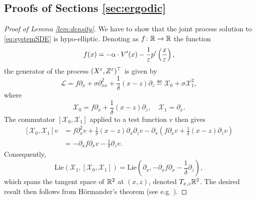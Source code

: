 \documentclass[10pt]{article}
\begin{document}
\begin{appendices}
	
\section{Proofs of Sections \ref{sec:ergodic}}\label{ap:ProofsErgodic}

\begin{proof}[Proof of Lemma \ref{lem:density}] We have to show that the joint process solution to \eqref{eq:systemSDE} is hypo-elliptic. Denoting as $f\colon \mathbb{R} \to \mathbb{R}$ the function 
	\begin{equation}
	f(x) = -\alpha \cdot V'(x) - \frac1{\varepsilon} p'\left(\frac{x}{\varepsilon}\right),
	\end{equation}
	the generator of the process $(X^\varepsilon, Z^\varepsilon)^\top$ is given by
	\begin{equation}
	\mathcal L = f \partial_x + \sigma \partial_{xx}^2 + \frac1\delta (x - z)\partial_z \eqdef \mathcal X_0 + \sigma \mathcal X_1^2, 
	\end{equation}
	where 
	\begin{equation}
	\mathcal X_0 = f \partial_x + \frac1\delta (x - z)\partial_z, \quad \mathcal X_1 = \partial_x.
	\end{equation}
	The commutator $[\mathcal X_0, \mathcal X_1]$ applied to a test function $v$ then gives
	\begin{equation}
	\begin{aligned}
	[\mathcal X_0, \mathcal X_1]v &= f \partial_x^2 v + \frac1\delta (x - z) \partial_x \partial_z v  - \partial_x\left(f\partial_x v + \frac1\delta (x - z)\partial_z v\right)\\
	&= -\partial_x f \partial_x v - \frac1\delta \partial_z v.
	\end{aligned}
	\end{equation}
	Consequently, 
	\begin{equation}
	\mathrm{Lie}\left(\mathcal X_1, [\mathcal X_0, \mathcal X_1]\right) = \mathrm{Lie} \left(\partial_x, -\partial_x f \partial_x - \frac1\delta\partial_z\right),
	\end{equation}
	which spans the tangent space of $\mathbb{R}^2$ at $(x, z)$, denoted $T_{x, z}\mathbb{R}^2$. The desired result then follows from Hörmander's theorem (see e.g. \cite[Chapter 6]{Pav14}).
\end{proof}


\end{appendices}
\end{document}
